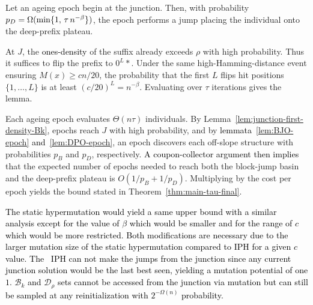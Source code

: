 \begin{lemma} \label{lem:DPO-epoch}
	Let an ageing epoch begin at the junction.
	Then, with probability $\textcolor{black}{p_D}=\Omega(\min\{1,\,\tau\,n^{-\beta}\})$, the epoch performs a jump placing the individual onto the deep-prefix plateau.
\end{lemma}

At $J$, the \textcolor{black}{ones-density} of the suffix already exceeds $\rho$ with high probability.
Thus it suffices to flip the prefix to $0^L *$.
Under the same high-Hamming-distance event ensuring $M(x)\ge cn/20$, the probability that the first $L$ flips hit positions $\{1,\dots,L\}$ is at least $(c/20)^L = n^{-\beta}$.
Evaluating over $\tau$ iterations gives the lemma.

Each ageing epoch evaluates $\Theta(n\tau)$ individuals.
By Lemma~\ref{lem:junction-first-density-Bk}, epochs reach $J$ with high probability, and by \textcolor{black}{lemmata~\ref{lem:BJO-epoch} and~\ref{lem:DPO-epoch}}, an epoch discovers each off-slope structure with probabilities $p_B$ and $p_D$, respectively.
\textcolor{black}{A coupon-collector argument then implies} that the expected number of epochs needed to reach both the block-jump basin and the deep-prefix plateau is $O(1/p_B + 1/p_D)$.
Multiplying by the cost per epoch yields the bound stated in Theorem~\ref{thm:main-tau-final}.

\textcolor{black}{The static hypermutation would yield a same upper bound with a similar analysis except for the value of $\beta$ which would be smaller and for the range of $c$ which would be more restricted. Both modifications are necessary due to the larger mutation size of the static hypermutation compared to IPH for a given $c$ value. The \lastBest~IPH can not make the jumps from the junction since any current junction solution would be the last best seen, yielding a mutation potential of one $1$. $\mathcal{B}_k$ and $\mathcal{D}_\rho$ sets cannot be accessed from the junction via mutation but can still be sampled at any reinitialization with $2^{-\Omega(n)}$ probability.}
